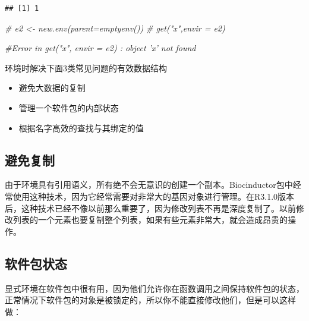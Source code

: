 \documentclass[]{book}
\newenvironment{Shaded}{\begin{snugshade}}{\end{snugshade}}
\newcommand{\KeywordTok}[1]{\textcolor[rgb]{0.13,0.29,0.53}{\textbf{#1}}}
\newcommand{\DataTypeTok}[1]{\textcolor[rgb]{0.13,0.29,0.53}{#1}}
\newcommand{\DecValTok}[1]{\textcolor[rgb]{0.00,0.00,0.81}{#1}}
\newcommand{\StringTok}[1]{\textcolor[rgb]{0.31,0.60,0.02}{#1}}
\newcommand{\CommentTok}[1]{\textcolor[rgb]{0.56,0.35,0.01}{\textit{#1}}}
\newcommand{\ControlFlowTok}[1]{\textcolor[rgb]{0.13,0.29,0.53}{\textbf{#1}}}
\newcommand{\OperatorTok}[1]{\textcolor[rgb]{0.81,0.36,0.00}{\textbf{#1}}}
\newcommand{\NormalTok}[1]{#1}
\begin{document}
\begin{verbatim}
## [1] 1
\end{verbatim}

\begin{Shaded}
\begin{Highlighting}[]
\CommentTok{# e2 <- new.env(parent=emptyenv())}
\CommentTok{# get("x",envir = e2)}

\CommentTok{#Error in get("x", envir = e2) : object 'x' not found}
\end{Highlighting}
\end{Shaded}

环境时解决下面3类常见问题的有效数据结构

\begin{itemize}
\item
  避免大数据的复制
\item
  管理一个软件包的内部状态
\item
  根据名字高效的查找与其绑定的值
\end{itemize}

\subsection{避免复制}

由于环境具有引用语义，所有绝不会无意识的创建一个副本。Biocinductor包中经常使用这种技术，因为它经常需要对非常大的基因对象进行管理。在R3.1.0版本后，这种技术已经不像以前那么重要了，因为修改列表不再是深度复制了。以前修改列表的一个元素也要复制整个列表，如果有些元素非常大，就会造成昂贵的操作。

\subsection{软件包状态}

显式环境在软件包中很有用，因为他们允许你在函数调用之间保持软件包的状态，正常情况下软件包的对象是被锁定的，所以你不能直接修改他们，但是可以这样做：

\begin{Shaded}
\end{Shaded}
\end{document}
